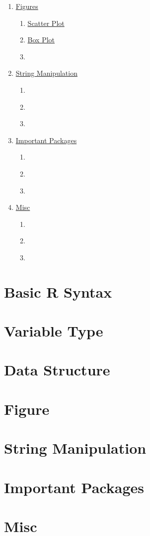 \documentclass[
  12pt,
]{article}
\begin{document}
\begin{enumerate}
\begin{enumerate}
  \item \hyperref[sec:DS-]{}
  \end{enumerate}
\item \hyperref[sec:Fig]{Figures}
  \begin{enumerate}
  \item \hyperref[sec:Fig-]{Scatter Plot}
  \item \hyperref[sec:Fig-]{Box Plot}
  \item \hyperref[sec:Fig-]{}
  \end{enumerate}
\item \hyperref[sec:SM]{String Manipulation}
  \begin{enumerate}
  \item \hyperref[sec:SM-]{}
  \item \hyperref[sec:SM-]{}
  \item \hyperref[sec:SM-]{}
  \end{enumerate}
\item \hyperref[sec:Pkg]{Important Packages}
  \begin{enumerate}
  \item \hyperref[sec:Pkg-]{}
  \item \hyperref[sec:Pkg-]{}
  \item \hyperref[sec:Pkg-]{}
  \end{enumerate}
\item \hyperref[sec:Misc]{Misc}
  \begin{enumerate}
  \item \hyperref[sec:Misc-]{}
  \item \hyperref[sec:Misc-]{}
  \item \hyperref[sec:Misc-]{}
  \end{enumerate}
\end{enumerate}

\newpage
\section{Basic R Syntax}
\label{sec:BRS}

\newpage
\section{Variable Type}
\label{sec:VAR}

\newpage
\section{Data Structure}
\label{sec:DS}

\newpage
\section{Figure}
\label{sec:Fig}

\newpage
\section{String Manipulation}
\label{sec:SM}

\newpage
\section{Important Packages}
\label{sec:Pkg}

\newpage
\section{Misc}
\label{sec:Misc}
\end{document}
